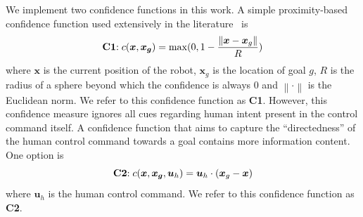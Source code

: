 \documentclass[conference]{IEEEtran}
\newcommand{\norm}[1]{\left\lVert#1\right\rVert}
\begin{document}
We implement two confidence functions in this work. A simple proximity-based confidence function used extensively in the literature~\cite{dragan2012assistive,dragan2012formalizing,dragan2013policy} is
\begin{equation*}\label{C1}
\textrm{\textbf{C1}:}\; c(\boldsymbol{x}, \boldsymbol{x_g}) = \max(0, 1 - \frac{\norm{\boldsymbol{x} - \boldsymbol{x}_{g}}}{R})
\end{equation*}
where $\boldsymbol{x}$ is the current position of the robot, $\boldsymbol{x}_{g}$ is the location of goal $g$, $R$ is the radius of a sphere beyond which the confidence is always $0$ and $\norm{\cdot}$ is the Euclidean norm. We refer to this confidence function as \textbf{C1}. However, this confidence measure ignores all cues regarding human intent present in the control command itself. A confidence function that aims to capture the ``directedness'' of the human control command towards a goal contains more information content. One option is
\begin{equation*}\label{C2}
\textrm{\textbf{C2}:}\; c({\boldsymbol{x},\boldsymbol{x_g}, \boldsymbol{u}_{h}}) = \boldsymbol{u}_h\cdot(\boldsymbol{x}_{g} - \boldsymbol{x})
\end{equation*}
where $\boldsymbol{u}_h$ is the human control command. We refer to this confidence function as \textbf{C2}. 
\end{document}
